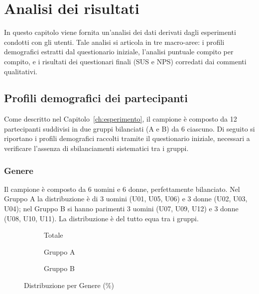 \chapter{Analisi dei risultati}
\label{ch:analisi}

In questo capitolo viene fornita un'analisi dei dati derivati dagli esperimenti condotti con gli utenti. Tale analisi si articola in tre macro-aree: i profili demografici estratti dal questionario iniziale, l'analisi puntuale compito per compito, e i risultati dei questionari finali (SUS e NPS) corredati dai commenti qualitativi.

\section{Profili demografici dei partecipanti}

Come descritto nel Capitolo~\ref{ch:esperimento}, il campione è composto da 12 partecipanti suddivisi in due gruppi bilanciati (A e B) da 6 ciascuno. Di seguito si riportano i profili demografici raccolti tramite il questionario iniziale, necessari a verificare l'assenza di sbilanciamenti sistematici tra i gruppi.

\subsection{Genere}
Il campione è composto da 6 uomini e 6 donne, perfettamente bilanciato. Nel Gruppo A la distribuzione è di 3 uomini (U01, U05, U06) e 3 donne (U02, U03, U04); nel Gruppo B si hanno parimenti 3 uomini (U07, U09, U12) e 3 donne (U08, U10, U11). La distribuzione è del tutto equa tra i gruppi.

\vspace{0.5em}
\begin{figure}[H]
    \centering
    \begin{subfigure}{0.33\textwidth}
        \centering
        \caption{Totale}
    \end{subfigure}%
    \hfill
    \begin{subfigure}{0.33\textwidth}
        \centering
        \caption{Gruppo A}
    \end{subfigure}%
    \hfill
    \begin{subfigure}{0.33\textwidth}
        \centering
        \caption{Gruppo B}
    \end{subfigure}
    \caption{Distribuzione per Genere (\%)}
\end{figure}

